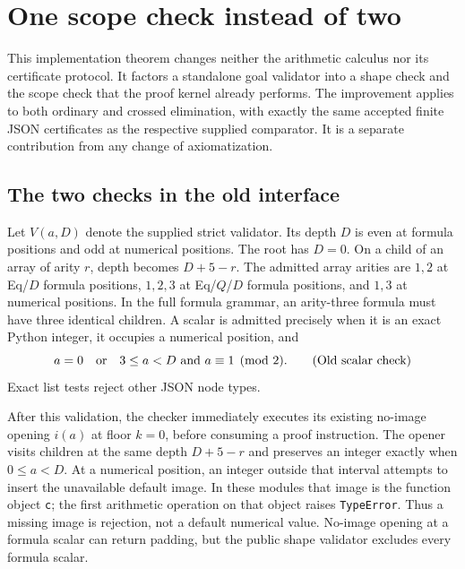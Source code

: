 \section{One scope check instead of two}
\label{scope:section}

This implementation theorem changes neither the arithmetic calculus nor
its certificate protocol. It factors a standalone goal validator into a
shape check and the scope check that the proof kernel already performs.
The improvement applies to both ordinary and crossed elimination, with
exactly the same accepted finite JSON certificates as the respective
supplied comparator. It is a separate contribution from any change of
axiomatization.

\subsection{The two checks in the old interface}

Let $V(a,D)$ denote the supplied strict validator. Its depth $D$ is even
at formula positions and odd at numerical positions. The root has
$D=0$. On a child of an array of arity $r$, depth becomes $D+5-r$.
The admitted array arities are $1,2$ at Eq/$D$ formula positions, $1,2,3$
at Eq/$Q$/$D$ formula positions, and $1,3$ at numerical positions.
In the full formula grammar, an arity-three formula must have three
identical children. A scalar is admitted precisely when it is an exact
Python integer, it occupies a numerical position, and
\[
 a=0\quad\hbox{or}\quad 3\leq a<D\ \hbox{and}\ a\equiv1\pmod2.
 \tag{Old scalar check}\label{scope:oldscalar}
\]
Exact list tests reject other JSON node types.

After this validation, the checker immediately executes its existing
no-image opening $i(a)$ at floor $k=0$, before consuming a proof
instruction. The opener visits children at the same depth $D+5-r$ and
preserves an integer exactly when $0\leq a<D$. At a numerical position,
an integer outside that interval attempts to insert the unavailable
default image. In these modules that image is the function object
\texttt{c}; the first arithmetic operation on that object raises
\texttt{TypeError}. Thus a missing image is rejection, not a default
numerical value. No-image opening at a formula scalar can return padding,
but the public shape validator excludes every formula scalar.

